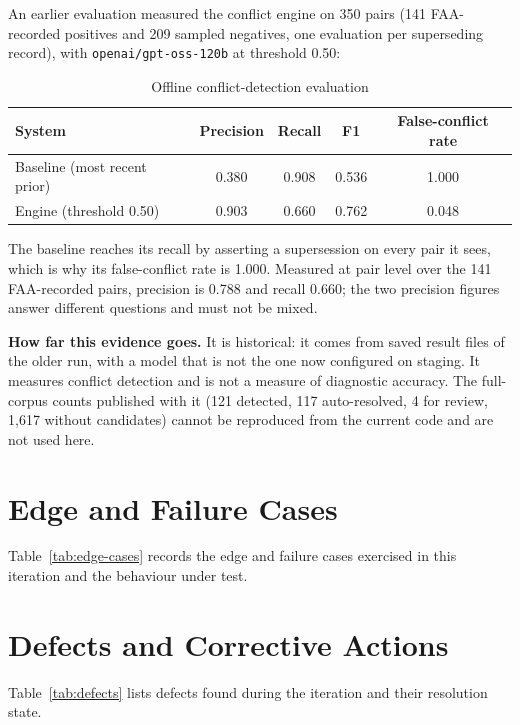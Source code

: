 An earlier evaluation measured the conflict engine on 350 pairs (141 FAA-recorded positives and 209 sampled negatives, one evaluation per superseding record), with \texttt{openai/gpt-oss-120b} at threshold 0.50:

\begin{table}[!htbp]
\centering
\caption{Offline conflict-detection evaluation}
\label{tab:offline-eval}
\small
\begin{tabularx}{\textwidth}{@{}L c c c c@{}}
\toprule
System & Precision & Recall & F1 & False-conflict rate \\
\midrule
Baseline (most recent prior) & 0.380 & 0.908 & 0.536 & 1.000 \\
Engine (threshold 0.50) & 0.903 & 0.660 & 0.762 & 0.048 \\
\bottomrule
\end{tabularx}
\end{table}

The baseline reaches its recall by asserting a supersession on every pair it sees, which is why its false-conflict rate is 1.000. Measured at pair level over the 141 FAA-recorded pairs, precision is 0.788 and recall 0.660; the two precision figures answer different questions and must not be mixed.

\textbf{How far this evidence goes.} It is historical: it comes from saved result files of the older run, with a model that is not the one now configured on staging. It measures conflict detection and is not a measure of diagnostic accuracy. The full-corpus counts published with it (121 detected, 117 auto-resolved, 4 for review, 1{,}617 without candidates) cannot be reproduced from the current code and are not used here.

\section{Edge and Failure Cases}

Table~\ref{tab:edge-cases} records the edge and failure cases exercised in this iteration and the behaviour under test.



\section{Defects and Corrective Actions}

Table~\ref{tab:defects} lists defects found during the iteration and their resolution state.

